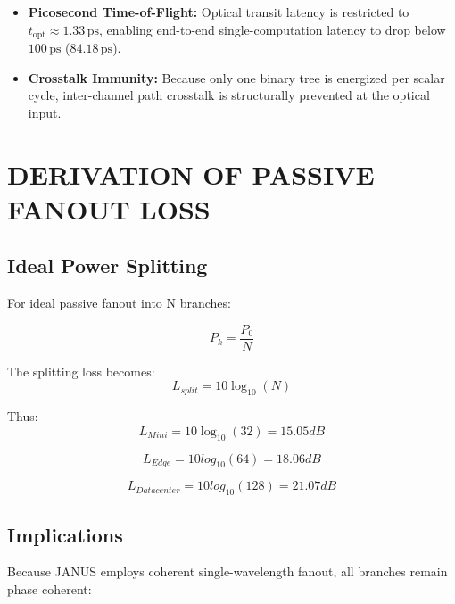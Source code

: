 \documentclass[journal]{IEEEtran}
\begin{document}
\begin{enumerate}
\begin{itemize}
\item \textbf{Picosecond Time-of-Flight:} Optical transit latency is restricted to $t_{\mathrm{opt}} \approx 1.33\,\mathrm{ps}$, enabling end-to-end single-computation latency to drop below $100\,\mathrm{ps}$ ($84.18\,\mathrm{ps}$).
\item \textbf{Crosstalk Immunity:} Because only one binary tree is energized per scalar cycle, inter-channel path crosstalk is structurally prevented at the optical input.
\end{itemize}
\end{enumerate}

\section{DERIVATION OF PASSIVE FANOUT LOSS}

\subsection{\textbf{Ideal Power Splitting}}

For ideal passive fanout into N branches:

\begin{equation}
P_{k} = \frac{P_0}{N}
\end{equation}

The splitting loss becomes:
\begin{equation}
L_{split} = 10 \log_{10}(N)
\end{equation}

Thus:
\begin{equation}
L_{Mini} = 10 \log_{10}(32) = 15.05 dB
\end{equation}

\begin{equation}
L_{Edge} = 10 log_{10}(64) = 18.06 dB
\end{equation}

\begin{equation}
L_{Datacenter} = 10 log_{10}(128) = 21.07 dB
\end{equation}


\subsection{\textbf{Implications}}

Because JANUS employs coherent single-wavelength fanout, all branches remain phase coherent:

\begin{center}
\end{center}
\end{document}
